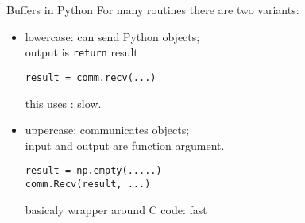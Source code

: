 \begin{numberedframe}{Buffers in Python}
  For many routines there are two variants:
  \begin{itemize}
  \item lowercase: can send Python objects;\\
    output is \lstinline{return} result\\
\begin{verbatim}
result = comm.recv(...)
\end{verbatim}
    this uses : slow.
  \item uppercase: communicates  objects;\\
    input and output are function argument.
\begin{verbatim}
result = np.empty(.....)
comm.Recv(result, ...)
\end{verbatim}
    basicaly wrapper around C code: fast
  \end{itemize}
\end{numberedframe}

\begin{exerciseframe}[randommax]
  
\end{exerciseframe}

\begin{comment}
\begin{numberedframe}{Random numbers in C}
\lstset{language=C}
\begin{lstlisting}
// Initialize the random number generator
srand(procno*(double)RAND_MAX/nprocs);
// compute a random number
randomfraction = (rand() / (double)RAND_MAX);
\end{lstlisting}
\end{numberedframe}

\begin{numberedframe}{Random numbers in Fortran}
\lstset{language=Fortran}
\begin{lstlisting}
integer :: randsize
real :: random_value
call random_number(random_value)
\end{lstlisting}
\begin{lstlisting}
integer,allocatable,dimension(:) :: randseed
call random_seed(size=randsize)
allocate(randseed(randsize))
randseed(:) = 1023*procno
call random_seed(put=randseed)  
\end{lstlisting}
\lstset{language=C}
\end{numberedframe}

\begin{numberedframe}{Random numbers in Python}
\lstset{language=Python}
\begin{lstlisting}
import random

random.seed(procno)

random_value = random.random()
\end{lstlisting}
\lstset{language=C}
\end{numberedframe}
\end{comment}


